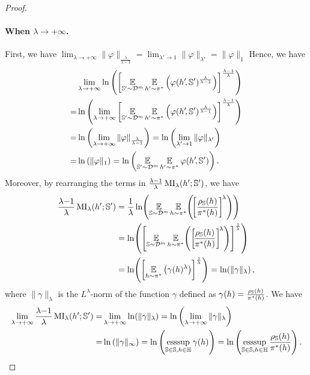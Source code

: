 \begin{noaddcontents}
\begin{proof}
\paragraph{When \mbox{$\lambda\rightarrow +\infty$}.} First, we have $\lim_{\lambda\rightarrow +\infty} \|\varphi\|_{\frac{\lambda}{\lambda{-}1}} = \lim_{\lambda'\rightarrow 1} \|\varphi\|_{\lambda'} = \|\varphi\|_1$ 
Hence, we have 
\begin{align*}
    &\lim_{\lambda\rightarrow+\infty} \ln\left(\left[\operatorname*{\mathbb{E}}_{\mathbb{S}'{\sim}\mathcal{D}^{m}}\operatorname*{\mathbb{E}}_{h'{\sim}\pi^*}\left(\varphi(h'\!, \mathbb{S}')^{\frac{\lambda}{\lambda{-}1}}\right)\right]^{\frac{\lambda{-}1}{\lambda}}\right)\\
    = &\ln\left( \lim_{\lambda\rightarrow+\infty} \left[\operatorname*{\mathbb{E}}_{\mathbb{S}'{\sim}\mathcal{D}^{m}}\operatorname*{\mathbb{E}}_{h'{\sim}\pi^*}\left(\varphi(h'\!, \mathbb{S}')^{\frac{\lambda}{\lambda{-}1}}\right)\right]^{\frac{\lambda{-}1}{\lambda}}\right)\\
    = &\ln\left( \lim_{\lambda\rightarrow+\infty} \| \varphi\|_{\frac{\lambda}{\lambda-1}}\right) = \ln\left( \lim_{\lambda'\rightarrow1} \| \varphi\|_{\lambda'}\right)\\
    = &\ln\left( \| \varphi\|_{1}\right) = \ln\left( \operatorname*{\mathbb{E}}_{\mathbb{S}'{\sim}\mathcal{D}^{m}}\operatorname*{\mathbb{E}}_{h'{\sim}\pi^*}\varphi(h'\!, \mathbb{S}') \right).
\end{align*}
Moreover, by rearranging the terms in $\frac{\lambda{-}1}{\lambda}\operatorname{MI}_{\lambda}(h'; \mathbb{S}')$, we have
\begin{align*}
\frac{\lambda{-}1}{\lambda}\MI_{\lambda}(\h'; \S') &= \frac{1}{\lambda}\ln\!\LP \EE_{\S{\sim}\D^\m}\EE_{\h{\sim}\P^*}\!\LP\!\LB\frac{ \AQ(\h)}{\P^*(\h)}\RB^{\!\lambda}\RP\RP\\
&= \ln\!\LP \LB\EE_{\S{\sim}\D^\m}\EE_{\h{\sim}\P^*}\!\LP\LB\!\frac{ \AQ(\h)}{\P^*(\h)}\RB^{\!\lambda}\RP\RB^{\frac{1}{\lambda}}\RP\\
&= \ln\!\LP \LB\EE_{\h{\sim}\P^*}\LP\gamma(\h)^{\lambda}\RP\RB^{\frac{1}{\lambda}}\RP = \ln\!\LP \| \gamma\|_{\lambda}\RP,
\end{align*}
where $\| \gamma\|_{\lambda}$ is the $L^{\lambda}$-norm of the function $\gamma$ defined as $\gamma(h)=\tfrac{\rho_{\mathbb{S}}(h)}{\pi^*(h)}$.
We have
\begin{align*}
    \lim_{\lambda\rightarrow +\infty}  \frac{\lambda{-}1}{\lambda}\operatorname{MI}_{\lambda}(h'; \mathbb{S}') =& \lim_{\lambda\rightarrow +\infty}  \ln\!\left( \| \gamma\|_{\lambda}\right) = \ln\left(\lim_{\lambda\rightarrow +\infty} \|\gamma\|_{\lambda}\right)\\
    =& \ln\left( \|\gamma\|_{\infty}\right) = \ln\left(\operatorname*{\text{\rm esssup}}_{\mathbb{S}\in\mathbb{S}, h\in\mathbb{H}}\gamma(h)\right) = \ln\left(\operatorname*{\text{\rm esssup}}_{\mathbb{S}\in\mathbb{S}, h\in\mathbb{H}}\frac{\rho_{\mathbb{S}}(h)}{\pi^*(h)}\right).
\end{align*}

\end{proof}
\end{noaddcontents}
